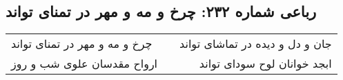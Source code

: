 \begin{center}
\section*{رباعی شماره ۲۳۲: چرخ و مه و مهر در تمنای تواند}
\label{sec:sh232}
\begin{longtable}{l p{0.5cm} r}
چرخ و مه و مهر در تمنای تواند
&&
جان و دل و دیده در تماشای تواند
\\
ارواح مقدسان علوی شب و روز
&&
ابجد خوانان لوح سودای تواند
\\
\end{longtable}
\end{center}
